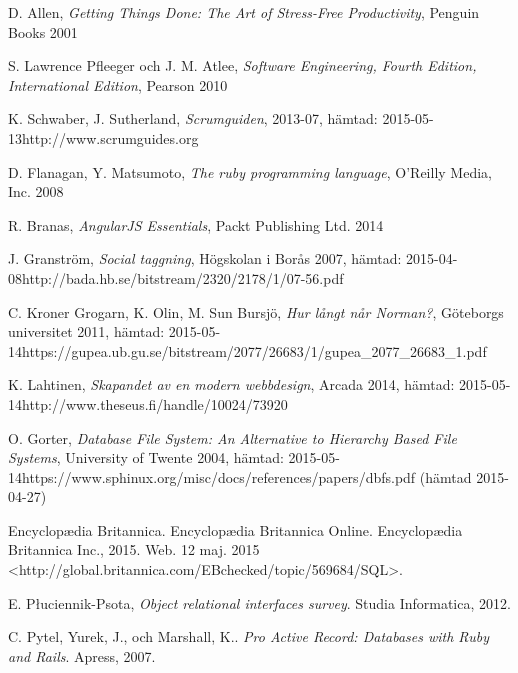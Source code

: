 \documentclass[a4paper,12pt,oneside,final]{extbook}
\begin{document}
\begin{thebibliography}{99}

  D. Allen, \emph{Getting Things Done: The Art of Stress-Free Productivity}, Penguin Books 2001

  S. Lawrence Pfleeger och J. M. Atlee, \emph{Software Engineering, Fourth Edition, International Edition}, Pearson 2010

  K. Schwaber, J. Sutherland, \emph{Scrumguiden}, 2013-07, hämtad: 2015-05-13\newline http://www.scrumguides.org

  D. Flanagan, Y. Matsumoto, \emph{The ruby programming language}, O'Reilly Media, Inc. 2008

  R. Branas, \emph{AngularJS Essentials}, Packt Publishing Ltd. 2014

  J. Granström, \emph{Social taggning}, Högskolan i Borås 2007, hämtad: 2015-04-08\newline http://bada.hb.se/bitstream/2320/2178/1/07-56.pdf

  C. Kroner Grogarn, K. Olin, M. Sun Bursjö, \emph{Hur långt når Norman?}, Göteborgs universitet 2011, hämtad: 2015-05-14\newline https://gupea.ub.gu.se/bitstream/2077/26683/1/gupea\_2077\_26683\_1.pdf

  K. Lahtinen, \emph{Skapandet av en modern webbdesign}, Arcada 2014, hämtad: 2015-05-14\newline http://www.theseus.fi/handle/10024/73920

  O. Gorter, \emph{Database File System: An Alternative to Hierarchy Based File Systems}, University of Twente 2004, hämtad: 2015-05-14\newline https://www.sphinux.org/misc/docs/references/papers/dbfs.pdf (hämtad 2015-04-27)

  Encyclopædia Britannica. Encyclopædia Britannica Online. Encyclopædia Britannica Inc., 2015. Web. 12 maj. 2015 <http://global.britannica.com/EBchecked/topic/569684/SQL>.

  E. Płuciennik-Psota, \emph{Object relational interfaces survey}. Studia Informatica, 2012.

  C. Pytel, Yurek, J., och Marshall, K.. \emph{Pro Active Record: Databases with Ruby and Rails}. Apress, 2007.


\end{thebibliography}
\end{document}
